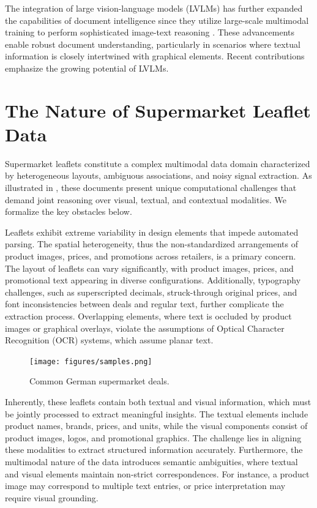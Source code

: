 \documentclass[11pt]{article}
\begin{document}
The integration of large vision-language models (LVLMs) has further expanded the capabilities of document intelligence since they utilize large-scale multimodal training to perform sophisticated image-text reasoning \cite{touvron2023,qwen2025,dai2023}. These advancements enable robust document understanding, particularly in scenarios where textual information is closely intertwined with graphical elements. Recent contributions \cite{li2024, wei2024} emphasize the growing potential of LVLMs. 

\section{The Nature of Supermarket Leaflet Data}  
\label{sec:leaflets_data}
Supermarket leaflets constitute a complex multimodal data domain characterized by heterogeneous layouts, ambiguous associations, and noisy signal extraction. As illustrated in , these documents present unique computational challenges that demand joint reasoning over visual, textual, and contextual modalities. We formalize the key obstacles below.

Leaflets exhibit extreme variability in design elements that impede automated parsing. The spatial heterogeneity, thus the non-standardized arrangements of product images, prices, and promotions across retailers, is a primary concern. The layout of leaflets can vary significantly, with product images, prices, and promotional text appearing in diverse configurations. Additionally, typography challenges, such as superscripted decimals, struck-through original prices, and font inconsistencies between deals and regular text, further complicate the extraction process. Overlapping elements, where text is occluded by product images or graphical overlays, violate the assumptions of Optical Character Recognition (OCR) systems, which assume planar text.

\begin{figure}[h!]
    \centering
    \texttt{[image: figures/samples.png]}
    \caption{Common German supermarket deals.}
    \label{fig:leaflet_data_samples}
\end{figure}

Inherently, these leaflets contain both textual and visual information, which must be jointly processed to extract meaningful insights. The textual elements include product names, brands, prices, and units, while the visual components consist of product images, logos, and promotional graphics. The challenge lies in aligning these modalities to extract structured information accurately. Furthermore, the multimodal nature of the data introduces semantic ambiguities, where textual and visual elements maintain non-strict correspondences. For instance, a product image may correspond to multiple text entries, or price interpretation may require visual grounding.
\end{document}
